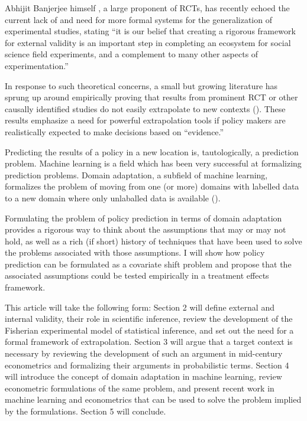 \documentclass[a4paper,12pt]{article}
\begin{document}
Abhijit Banjerjee himself \parencite*{Snowberg2016}, a large proponent of RCTs, has recently echoed the current lack of and need for more formal systems for the generalization of experimental studies, stating ``it is our belief that creating a rigorous framework for external validity is an important step in completing an ecosystem for social science field experiments, and a complement to many other aspects of experimentation.''

In response to such theoretical concerns, a small but growing literature  has sprung up around empirically proving that results from prominent RCT or other causally identified studies do not easily extrapolate to new contexts (\cite{Pritchett2016, Allcott2015, Bisbee2017, Rosenzweig2019}). These results emphasize a need for powerful extrapolation tools if policy makers are realistically expected to make decisions based on ``evidence.''

Predicting the results of a policy in a new location is, tautologically, a prediction problem. Machine learning is a field which has been very successful at formalizing prediction problems. Domain adaptation, a subfield of machine learning, formalizes the problem of moving from one (or more) domains with labelled data to a new domain where only unlaballed data is available (\cite[for a survey, see][]{Pan2010}).

Formulating the problem of policy prediction in terms of domain adaptation provides a rigorous way to think about the assumptions that may or may not hold, as well as a rich (if short) history of techniques that have been used to solve the problems associated with those assumptions. I will show how policy prediction can be formulated as a covariate shift problem and propose that the associated assumptions could be tested empirically in a treatment effects framework.

This article will take the following form: Section 2 will define external and internal validity, their role in scientific inference, review the development of the Fisherian experimental model of statistical inference, and set out the need for a formal framework of extrapolation. Section 3 will argue that a target context is necessary by reviewing the development of such an argument in mid-century econometrics and formalizing their arguments in probabilistic terms. Section 4 will introduce the concept of domain adaptation in machine learning, review econometric formulations of the same problem, and present recent work in machine learning and econometrics that can be used to solve the problem implied by the formulations. Section 5 will conclude.
\end{document}
